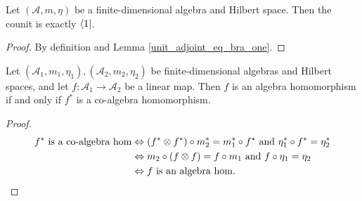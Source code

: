  \begin{lemma}\label{counit_eq_bra_one}
  \leanok
  Let $(\mathcal{A},m,\eta)$ be a finite-dimensional algebra and Hilbert space. Then the counit is exactly $\left\langle1\right\rvert$.
 \end{lemma}
 \begin{proof}\leanok
  By definition and Lemma \ref{unit_adjoint_eq_bra_one}.
 \end{proof}

 \begin{proposition}\label{isAlgHom_iff_adjoint_isCoalgHom}
  \leanok
  Let $(\mathcal{A}_1,m_1,\eta_1),(\mathcal{A}_2,m_2,\eta_2)$ be finite-dimensional algebras and Hilbert spaces, and let $f\colon\mathcal{A}_1\to\mathcal{A}_2$ be a linear map. Then $f$ is an algebra homomorphism if and only if $f^*$ is a co-algebra homomorphism.
 \end{proposition}
 \begin{proof}\leanok
  \begin{align*}
   f^*\text{ is a co-algebra hom} &\Leftrightarrow (f^*\otimes f^*)\circ m_2^*=m_1^*\circ f^* \text{ and }\eta_1^*\circ f^*=\eta_2^*\\
   &\Leftrightarrow m_2\circ(f\otimes f)=f\circ m_1\text{ and }f\circ\eta_1=\eta_2\\
   &\Leftrightarrow f\text{ is an algebra hom}.
  \end{align*}
 \end{proof}
